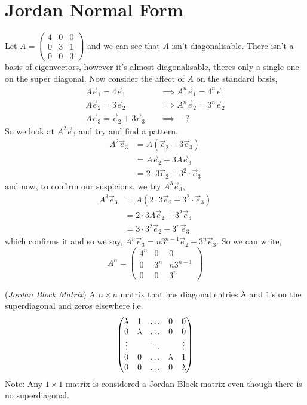 \documentclass{article}
\begin{document}
\section{Jordan Normal Form}
\begin{eg}
  Let $\displaystyle{A = \begin{pmatrix}
    4 & 0 & 0\\
    0 & 3 & 1\\
    0 & 0 & 3
  \end{pmatrix}}$ and we can see that $A$ isn't diagonalisable. There isn't a basis of eigenvectors, however it's almost diagonalisable, theres only a single one on the super diagonal. Now consider the affect of $A$ on the standard basis,
  \begin{align*}
    A\vec e_1 = 4\vec e_1 \quad &\implies A^n\vec e_1 = 4^n\vec e_1\\
    A\vec e_2 = 3\vec e_2 \quad &\implies A^n\vec e_2 = 3^n\vec e_2\\
    A\vec e_3 = \vec e_2 + 3\vec e_3 \quad &\implies \quad ?
  \end{align*}
  So we look at $A^2\vec e_3$ and try and find a pattern,
  \begin{align*}
    A^2\vec e_3 &= A(\vec e_2 + 3\vec e_3)\\
    &= A\vec e_2 + 3A\vec e_3 \\
    &= 2 \cdot 3\vec e_2 + 3^2 \cdot \vec e_3
  \end{align*}
  and now, to confirm our suspicions, we try $A^3\vec e_3$,
  \begin{align*}
    A^3\vec e_3 &= A(2 \cdot 3\vec e_2 + 3^2 \cdot \vec e_3)\\
    &= 2 \cdot 3 A\vec e_2 + 3^2 \vec e_3\\
    &= 3 \cdot 3^2 \vec e_2 + 3^n\vec e_3
  \end{align*}
  which confirms it and so we say, $A^n\vec e_3 = n 3^{n-1} \vec e_2 + 3^n\vec e_3$. So we can write,
  $$ A^n = \begin{pmatrix}
    4^n & 0 & 0 \\
    0 & 3^n & n3^{n-1} \\
    0 & 0 & 3^n
  \end{pmatrix} $$
\end{eg}

\begin{ndefi}{(\textit{Jordan Block Matrix})}
  A $n \times n$ matrix that has diagonal entries $\lambda$ and $1$'s on the superdiagonal and zeros elsewhere i.e.
  $$ \begin{pmatrix}
    \lambda & 1 & \dots & 0 & 0 \\
    0 & \lambda & \dots & 0 & 0 \\
    \vdots && \ddots && \vdots\\
    0 & 0 & \dots & \lambda & 1 \\
    0 & 0 & \dots & 0 & \lambda
  \end{pmatrix} $$
  Note: Any $1 \times 1$ matrix is considered a Jordan Block matrix even though there is no superdiagonal.
\end{ndefi}
\end{document}
